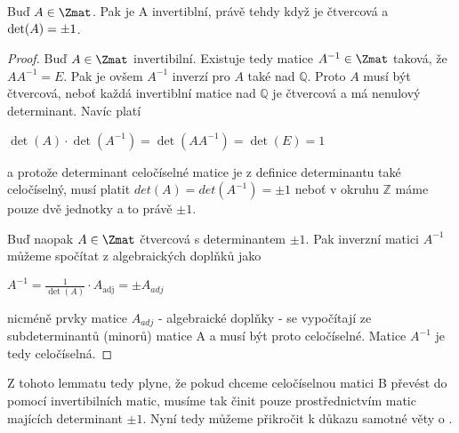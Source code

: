 \begin{lem}
    Buď $A \in \Zmat$. Pak je A invertiblní, právě tehdy když je čtvercová a
    $\textnormal{det}(A) = \pm1$.
\end{lem}
\begin{proof}
    Buď $A \in \Zmat$ invertibilní. Existuje tedy matice $A^{-1} \in \Zmat$
    taková, že $AA^{-1} = E$. Pak je ovšem $A^{-1}$ inverzí pro $A$ také nad
    $\mathbb{Q}$. Proto $A$ musí být čtvercová, neboť každá invertiblní matice
    nad $\mathbb{Q}$ je čtvercová a má nenulový determinant. Navíc platí
    \begin{center}
        $\det(A) \cdot \det(A^{-1}) = \det(AA^{-1}) = \det(E) = 1$
    \end{center}
    a protože determinant celočíselné matice je z definice determinantu
    také celočíselný, musí platit $det(A) = det(A^{-1}) = \pm1$ neboť v okruhu
    $\mathbb{Z}$ máme pouze dvě jednotky a to právě $\pm1$.

    Buď naopak  $A \in \Zmat$ čtvercová s determinantem $\pm1$. Pak inverzní
    matici $A^{-1}$ můžeme spočítat z algebraických doplňků jako
    \begin{center}
        $A^{-1} = \frac{1}{\operatorname{det}(A)} \cdot A_{\mathrm{adj}} = \pm A_{adj}$
    \end{center}
    nicméně prvky matice $A_{adj}$ - algebraické doplňky - se vypočítají
    ze subdeterminantů (minorů) matice A a musí být proto celočíselné. Matice
    $A^{-1}$ je tedy celočíselná.
\end{proof}

Z tohoto lemmatu tedy plyne, že pokud chceme celočíselnou matici B převést do
\snf pomocí invertibilních matic, musíme tak činit pouze prostřednictvím
matic majících determinant $\pm1$. Nyní tedy můžeme přikročit k důkazu samotné
věty o \snf.

